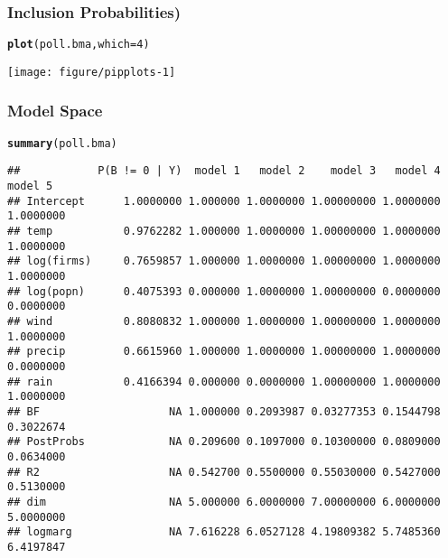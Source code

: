 \documentclass{beamer}\usepackage[]{graphicx}\usepackage[]{color}
\makeatletter
\def\maxwidth{ %
  \ifdim\Gin@nat@width>\linewidth
    \linewidth
  \else
    \Gin@nat@width
  \fi
}
\newcommand{\hlnum}[1]{\textcolor[rgb]{0.686,0.059,0.569}{#1}}%
\newcommand{\hlstd}[1]{\textcolor[rgb]{0.345,0.345,0.345}{#1}}%
\newcommand{\hlkwc}[1]{\textcolor[rgb]{0.333,0.667,0.333}{#1}}%
\newcommand{\hlkwd}[1]{\textcolor[rgb]{0.737,0.353,0.396}{\textbf{#1}}}%
\newenvironment{kframe}{%
 \def\at@end@of@kframe{}%
 \ifinner\ifhmode%
  \def\at@end@of@kframe{\end{minipage}}%
  \begin{minipage}{\columnwidth}%
 \fi\fi%
 \def\FrameCommand##1{\hskip\@totalleftmargin \hskip-\fboxsep
 \colorbox{shadecolor}{##1}\hskip-\fboxsep
     \hskip-\linewidth \hskip-\@totalleftmargin \hskip\columnwidth}%
 \MakeFramed {\advance\hsize-\width
   \@totalleftmargin\z@ \linewidth\hsize
   \@setminipage}}%
 {\par\unskip\endMakeFramed%
 \at@end@of@kframe}
\newenvironment{knitrout}{}{} %
\makeatother
\begin{document}
\begin{frame}\frametitle{Inclusion Probabilities)}
\begin{knitrout}
\color{fgcolor}\begin{kframe}
\begin{alltt}
\hlkwd{plot}\hlstd{(poll.bma,} \hlkwc{which}\hlstd{=}\hlnum{4}\hlstd{)}
\end{alltt}
\end{kframe}

{\centering \texttt{[image: figure/pipplots-1]} 

}



\end{knitrout}
\end{frame}


\begin{frame}[fragile]\frametitle{Model Space}
\begin{knitrout}
\color{fgcolor}\begin{kframe}
\begin{alltt}
\hlkwd{summary}\hlstd{(poll.bma)}
\end{alltt}
\begin{verbatim}
##            P(B != 0 | Y)  model 1   model 2    model 3   model 4   model 5
## Intercept      1.0000000 1.000000 1.0000000 1.00000000 1.0000000 1.0000000
## temp           0.9762282 1.000000 1.0000000 1.00000000 1.0000000 1.0000000
## log(firms)     0.7659857 1.000000 1.0000000 1.00000000 1.0000000 1.0000000
## log(popn)      0.4075393 0.000000 1.0000000 1.00000000 0.0000000 0.0000000
## wind           0.8080832 1.000000 1.0000000 1.00000000 1.0000000 1.0000000
## precip         0.6615960 1.000000 1.0000000 1.00000000 1.0000000 0.0000000
## rain           0.4166394 0.000000 0.0000000 1.00000000 1.0000000 1.0000000
## BF                    NA 1.000000 0.2093987 0.03277353 0.1544798 0.3022674
## PostProbs             NA 0.209600 0.1097000 0.10300000 0.0809000 0.0634000
## R2                    NA 0.542700 0.5500000 0.55030000 0.5427000 0.5130000
## dim                   NA 5.000000 6.0000000 7.00000000 6.0000000 5.0000000
## logmarg               NA 7.616228 6.0527128 4.19809382 5.7485360 6.4197847
\end{verbatim}
\end{kframe}
\end{knitrout}
\end{frame}
\end{document}
